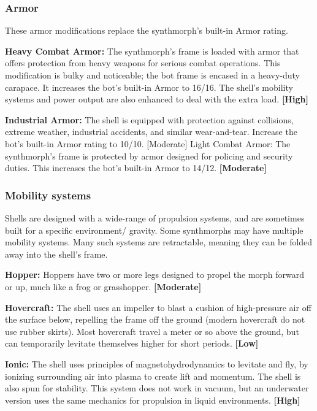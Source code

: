 \subsubsection{Armor} 

These armor modifications replace the synthmorph’s built-in Armor rating. 

\textbf{Heavy Combat Armor:} The synthmorph’s frame is loaded with armor that offers protection from heavy weapons for serious combat operations. This modification is bulky and noticeable; the bot frame is encased in a heavy-duty carapace. It increases the bot’s built-in Armor to 16/16. The shell’s mobility systems and power output are also enhanced to deal with the extra load. \textbf{[High]} 

\textbf{Industrial Armor:} The shell is equipped with protection against collisions, extreme weather, industrial accidents, and similar wear-and-tear. Increase the bot’s built-in Armor rating to 10/10. [Moderate] Light Combat Armor: The synthmorph’s frame is protected by armor designed for policing and security duties. This increases the bot’s built-in Armor to 14/12. \textbf{[Moderate]} 

\subsubsection{Mobility systems} 

Shells are designed with a wide-range of propulsion systems, and are sometimes built for a specific environment/ gravity. Some synthmorphs may have multiple mobility systems. Many such systems are retractable, meaning they can be folded away into the shell’s frame. 

\textbf{Hopper:} Hoppers have two or more legs designed to propel the morph forward or up, much like a frog or grasshopper. \textbf{[Moderate]} 

\textbf{Hovercraft:} The shell uses an impeller to blast a cushion of high-pressure air off the surface below, repelling the frame off the ground (modern hovercraft do not use rubber skirts). Most hovercraft travel a meter or so above the ground, but can temporarily levitate themselves higher for short periods. \textbf{[Low]} 

\textbf{Ionic:} The shell uses principles of magnetohydrodynamics to levitate and fly, by ionizing surrounding air into plasma to create lift and momentum. The shell is also spun for stability. This system does not work in vacuum, but an underwater version uses the same mechanics for propulsion in liquid environments. \textbf{[High]} 

